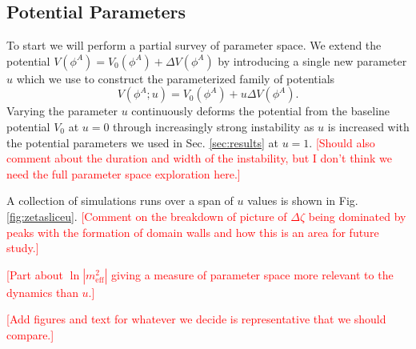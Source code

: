 \subsection{Potential Parameters}

To start we will perform a partial survey of parameter space. We extend the potential $V(\phi^A) = V_0(\phi^A) + \Delta V(\phi^A)$ by introducing a single new parameter $u$ which we use to construct the parameterized family of potentials
\begin{equation}
  V(\phi^A;u) = V_0(\phi^A) + u\Delta V(\phi^A).
\end{equation}
Varying the parameter $u$ continuously deforms the potential from the baseline potential $V_0$ at $u=0$ through increasingly strong instability as $u$ is increased with the potential parameters we used in Sec. \ref{sec:results} at $u=1$. \textcolor{red}{[Should also comment about the duration and width of the instability, but I don't think we need the full parameter space exploration here.]}

A collection of simulations runs over a span of $u$ values is shown in Fig. \ref{fig:zetasliceu}.
\textcolor{red}{[Comment on the breakdown of picture of $\Delta\zeta$ being dominated by peaks with the formation of domain walls and how this is an area for future study.]}

\Fzetasliceu

\Fpotparamu

\textcolor{red}{[Part about $\ln|m^2_\mathrm{eff}|$ giving a measure of parameter space more relevant to the dynamics than $u$.]}

\textcolor{red}{[Add figures and text for whatever we decide is representative that we should compare.]}

